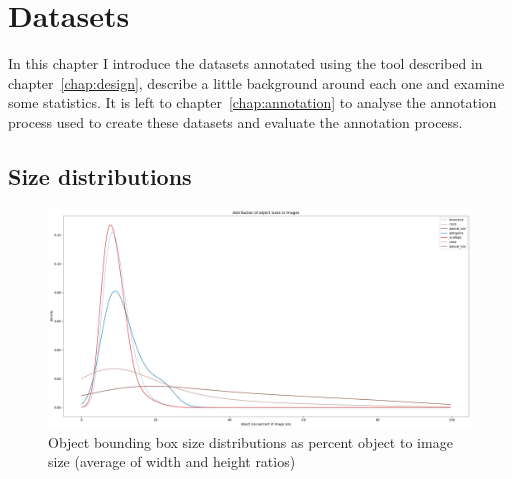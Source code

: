 \chapter{Datasets}
\label{chap:datasets} 

In this chapter I introduce the datasets annotated using the tool described in chapter~\ref{chap:design}, describe a little background around each one and examine some statistics. It is left to chapter~\ref{chap:annotation} to  analyse the annotation process used to create these datasets and evaluate the annotation process.



\section{Size distributions}

\begin{figure}[ht]
\centering
\includegraphics[width=0.9\linewidth]{charts/summaries/sizes_density.pdf}
\caption{Object bounding box size distributions as percent object to image size (average of width and height ratios) }
\label{fig:box_sizes}
\end{figure}







